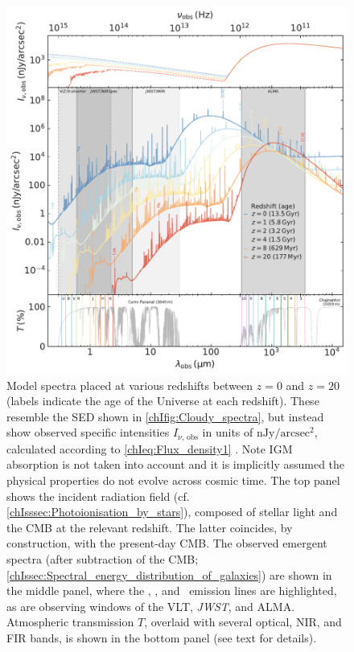 \begin{figure}
    \centering
    \includegraphics[width=\linewidth]{"Figs/Cloudy_spectra_redshift"}
    \caption[Model spectra placed at various redshifts between $z = 0$ and $z = 20$.]{Model spectra placed at various redshifts between $z = 0$ and $z = 20$ (labels indicate the age of the Universe at each redshift). These resemble the SED shown in \cref{chIfig:Cloudy_spectra}, but instead show observed specific intensities $I_{\nu, \, \text{obs}}$ in units of $\mathrm{nJy/arcsec^2}$, calculated according to \cref{chIeq:Flux_density1} . Note IGM absorption is not taken into account and it is implicitly assumed the physical properties do not evolve across cosmic time. The top panel shows the incident radiation field (cf. \cref{chIsssec:Photoionisation_by_stars}), composed of stellar light and the CMB at the relevant redshift. The latter coincides, by construction, with the present-day CMB. The observed emergent spectra (after subtraction of the CMB; \cref{chIssec:Spectral_energy_distribution_of_galaxies}) are shown in the middle panel, where the \lya, \Halpha, and \CIILam\ emission lines are highlighted, as are observing windows of the VLT, \textit{JWST}, and ALMA. Atmospheric transmission $T$, overlaid with several optical, NIR, and FIR bands, is shown in the bottom panel (see text for details).}
    \label{chIfig:Cloudy_spectra_redshift}
\end{figure}

